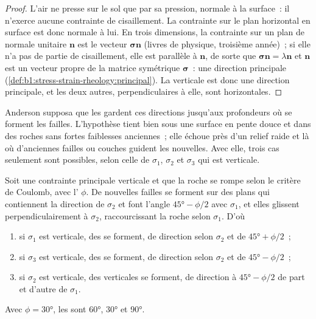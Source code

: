 \begin{proof}
L'air ne presse sur le sol que par sa pression, normale à la surface~:
il n'exerce aucune contrainte de cisaillement. La contrainte sur le plan horizontal en surface
est donc normale à lui. En trois dimensions, la contrainte sur un plan de normale
unitaire $\mathbf n$ est le vecteur $\boldsymbol\sigma\mathbf n$ (livres de physique,
troisième année)~; si elle n'a pas de partie de cisaillement, elle est parallèle à $\mathbf n$, de sorte que
$\boldsymbol\sigma\mathbf n = \lambda\mathbf n$ et $\mathbf n$ est un
vecteur propre de la matrice symétrique $\boldsymbol\sigma$~: une direction
principale (\cref{def:b1:stress-strain-rheology:principal}). La verticale est
donc une direction principale, et les deux autres, perpendiculaires à elle, sont
horizontales.
\end{proof}

Anderson supposa que les  gardent ces directions jusqu'aux
profondeurs où se forment les failles. L'hypothèse tient bien sous une surface en pente
douce et dans des roches sans fortes faiblesses anciennes~; elle échoue près d'un
relief raide et là où d'anciennes failles ou couches guident les nouvelles. Avec elle, trois cas seulement
sont possibles, selon celle de $\sigma_1$, $\sigma_2$ et
$\sigma_3$ qui est verticale.

\begin{theorem}\label{thm:b1:faults-folds-fabrics:anderson}
Soit une contrainte principale verticale et que la roche se rompe selon le critère de
Coulomb, avec l' $\phi$. De nouvelles failles se forment sur des
plans qui contiennent la direction de $\sigma_2$ et font l'angle
$\ang{45} - \phi/2$ avec $\sigma_1$, et elles glissent perpendiculairement à $\sigma_2$,
raccourcissant la roche selon $\sigma_1$. D'où
\begin{enumerate}[label=(\alph*)]
  \item si $\sigma_1$ est verticale, des  se forment, de direction selon
        $\sigma_2$ et de  $\ang{45} + \phi/2$~;
  \item si $\sigma_3$ est verticale, des  se forment, de direction selon
        $\sigma_2$ et de  $\ang{45} - \phi/2$~;
  \item si $\sigma_2$ est verticale, des  verticales se forment, de direction
        à $\ang{45} - \phi/2$ de part et d'autre de $\sigma_1$.
\end{enumerate}
Avec $\phi = \ang{30}$, les  sont \ang{60}, \ang{30} et \ang{90}.
\end{theorem}

